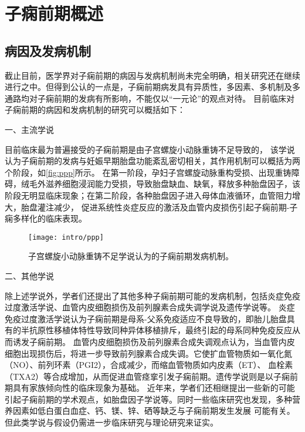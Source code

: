 \section{子痫前期概述}
\subsection{病因及发病机制}
截止目前，医学界对子痫前期的病因与发病机制尚未完全明确，相关研究还在继续进行之中。但得到公认的一点是，子痫前期病发具有异质性，多因素、多机制及多通路均对子痫前期的发病有所影响，不能仅以“一元论”的观点对待。
目前临床对子痫前期的病因和发病机制的研究可以概括如下：

一、主流学说

目前临床最为普遍接受的子痫前期是由子宫螺旋小动脉重铸不足导致的，
该学说认为子痫前期的发病与妊娠早期胎盘功能紊乱密切相关\cite{OAG9,Duvekot2010,2009ix}，其作用机制可以概括为两个阶段，如\autoref{fig:ppp}所示。
在第一阶段，孕妇子宫螺旋动脉重构受损、出现重铸障碍，绒毛外滋养细胞浸润能力受损，导致胎盘缺血、缺氧，释放多种胎盘因子，该阶段无明显临床现象；在第二阶段，各种胎盘因子进入母体血液循环，血管阻力增大，胎盘灌注减少，
促进系统性炎症反应的激活及血管内皮损伤引起子痫前期-子痫多样化的临床表现。
\begin{figure}[htbp]
    \centering
    \texttt{[image: intro/ppp]}
    \caption[子宫螺旋小动脉重铸不足学说认为的子痫前期发病机制]{\label{fig:ppp}子宫螺旋小动脉重铸不足学说认为的子痫前期发病机制\cite{Duvekot2010,2009ix}。}
\end{figure}

二、其他学说

除上述学说外，学者们还提出了其他多种子痫前期可能的发病机制，包括炎症免疫过度激活学说、血管内皮细胞损伤及前列腺素合成失调学说及遗传学说等。
炎症免疫过度激活学说认为子痫前期是母系-父系免疫适应不良导致的，即胎儿胎盘具有的半抗原性移植体特性导致同种异体移植排斥，最终引起的母系同种免疫反应从而诱发子痫前期\cite{Sibai2005,OAG9,Shi2006,Moffett2002}。
血管内皮细胞损伤及前列腺素合成失调观点认为，当血管内皮细胞出现损伤后，将进一步导致前列腺素合成失调\cite{OAG9,Sibai2005}。它使扩血管物质如一氧化氮（NO）、前列环素（PGI2），合成减少，而缩血管物质如内皮素（ET）、
血栓素（TXA2）等合成增加，从而促进血管痉挛引发子痫前期。遗传学说则是以子痫前期具有家族倾向性的临床现象为基础\cite{OAG9,Sibai2005,Ge2013}。
近年来，学者们还相继提出一些新的可能引起子痫前期的学术观点，如胎盘因子学说\cite{Shi2006}等。同时一些临床研究也发现，多种营养因素如低白蛋白血症、钙、镁、锌、硒等缺乏与子痫前期发生发展
可能有关\cite{OAG9}。但此类学说与假设仍需进一步临床研究与理论研究来证实。

